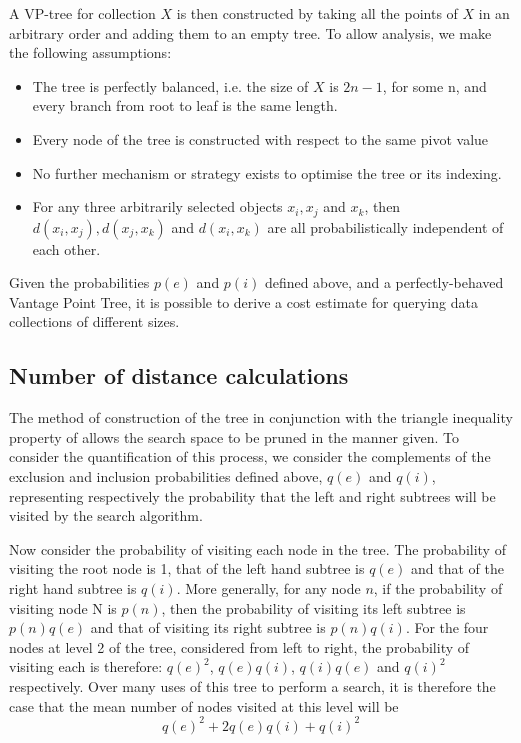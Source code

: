 A VP-tree for collection $X$ is then constructed by taking all the points of $X$ in an arbitrary order and adding them to an empty tree.
To allow analysis, we make the following assumptions:
\begin{itemize}
\item The tree is perfectly balanced, i.e. the size of $X$ is $2n - 1$, for some n, and every branch from root to leaf is the same length.
\item Every node of the tree is constructed with respect to the same pivot value 
\item No further mechanism or strategy exists to optimise the tree or its indexing.
\item For any three arbitrarily selected objects $x_i, x_j$ and $x_k$, then $d(x_i, x_j), d(x_j, x_k)$ and $d(x_i, x_k)$ are all probabilistically independent of each other.
\end{itemize}

Given the probabilities $p(e)$ and $p(i)$ defined above, and a perfectly-behaved Vantage Point Tree, it is possible to derive a cost estimate for querying data collections of different sizes.

\subsection{Number of distance calculations}
The method of construction of the tree in conjunction with the triangle inequality property of allows the search space to be pruned in the manner given. To consider the quantification of this process, we consider the complements of the exclusion and inclusion probabilities defined above, $q(e)$ and $q(i)$, representing respectively the probability that the left and right subtrees will be visited by the search algorithm.

Now consider the probability of visiting each node in the tree. The probability of visiting the root node is 1, that of the left hand subtree is $q(e)$ and that of the right hand subtree is $q(i)$. More generally, for any node $n$, if the probability of visiting node N is $p(n)$, then the probability of visiting its left subtree is $p(n)q(e)$ and that of visiting its right subtree is $p(n)q(i)$.
For the four nodes at level 2 of the tree, considered from left to right, the probability of visiting each is therefore: $q(e)^2$, $q(e)q(i)$, $q(i)q(e)$ and $q(i)^2$ respectively. Over many uses of this tree to perform a search, it is therefore the case that the mean number of nodes visited at this level will be 
\begin{equation}
q(e)^2 + 2q(e)q(i) + q(i)^2
\end{equation}

